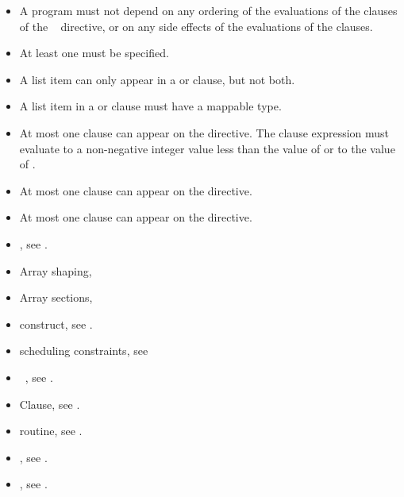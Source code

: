 \restrictions
\begin{itemize}
\item A program must not depend on any ordering of the evaluations of the 
      clauses of the ~ directive, or on any side 
      effects of the evaluations of the clauses.
\item At least one  must be specified.
\item A list item can only appear in a  or  clause, but not both.
\item A list item in a  or  clause must have a mappable type.
\item At most one  clause can appear on the directive. The
       clause expression must evaluate to a non-negative integer 
      value less than the value of  or to the value of 
      .
\item At most one  clause can appear on the directive.
\item At most one  clause can appear on the directive.
\end{itemize}

\crossreferences
\begin{itemize}
\item {}, see
.

\item Array shaping,

\item Array sections,

\item {} construct, see
.

\item {} scheduling constraints, see

\item {}~, see
.

\item {} Clause, see .

\item {} routine, see .

\item {}, see
.

\item {}, see
.
\end{itemize}



